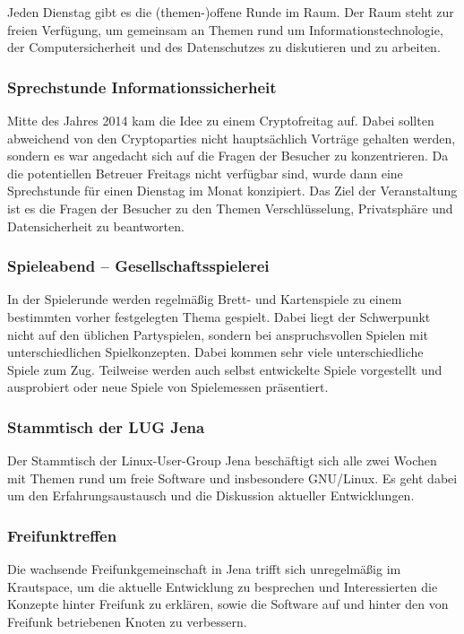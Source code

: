 \documentclass[ngerman]{scrartcl}
\begin{document}
Jeden Dienstag gibt es die (themen-)offene Runde im Raum. Der Raum
steht zur freien Verfügung, um gemeinsam an Themen rund um
Informationstechnologie, der Computersicherheit und des Datenschutzes
zu diskutieren und zu arbeiten.

\subsubsection{Sprechstunde Informationssicherheit}

Mitte des Jahres 2014 kam die Idee zu einem Cryptofreitag auf. Dabei
sollten abweichend von den Cryptoparties nicht hauptsächlich Vorträge
gehalten werden, sondern es war angedacht sich auf die Fragen der
Besucher zu konzentrieren.  Da die potentiellen Betreuer Freitags
nicht verfügbar sind, wurde dann eine Sprechstunde für einen Dienstag
im Monat konzipiert.  Das Ziel der Veranstaltung ist es die Fragen der
Besucher zu den Themen Verschlüsselung, Privatsphäre und
Datensicherheit zu beantworten.

\subsubsection{Spieleabend -- Gesellschaftsspielerei}

In der Spielerunde werden regelmäßig Brett- und Kartenspiele zu einem
bestimmten vorher festgelegten Thema gespielt. Dabei liegt der
Schwerpunkt nicht auf den üblichen Partyspielen, sondern bei
anspruchsvollen Spielen mit unterschiedlichen Spielkonzepten. Dabei
kommen sehr viele unterschiedliche Spiele zum Zug. Teilweise werden
auch selbst entwickelte Spiele vorgestellt und ausprobiert oder neue
Spiele von Spielemessen präsentiert.

\subsubsection{Stammtisch der LUG Jena}

Der Stammtisch der Linux-User-Group Jena beschäftigt sich alle zwei
Wochen mit Themen rund um freie Software und insbesondere
GNU/Linux. Es geht dabei um den Erfahrungsaustausch und die Diskussion
aktueller Entwicklungen.

\subsubsection{Freifunktreffen}

Die wachsende Freifunkgemeinschaft in Jena trifft sich unregelmäßig im
Krautspace, um die aktuelle Entwicklung zu besprechen und
Interessierten die Konzepte hinter Freifunk zu erklären, sowie die
Software auf und hinter den von Freifunk betriebenen Knoten zu
verbessern.
\end{document}
